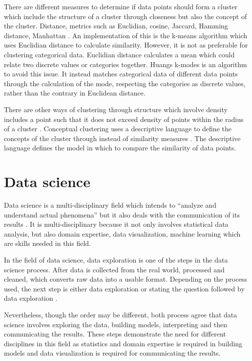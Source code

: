 There are different measures to determine if data points should form a cluster which include the structure of a cluster through closeness but also the concept of the cluster. Distance, metrics such as Euclidian, cosine, Jaccard, Hamming distance, Manhattan \cite{oneilschutt2014}. An implementation of this is the k-means algorithm which uses Euclidian distance to calculate similarity. However, it is not as preferable for clustering categorical data. Euclidian distance calculates a mean which could relate two discrete values or categories together. Huang\textsc{}s k-modes \cite{Huang1998} is an algorithm to avoid this issue. It instead matches categorical data of different data points through the calculation of the mode, respecting the categories as discrete values, rather than the contrary in Euclidean distance. \par

There are other ways of clustering through structure which involve density includes a point such that it does not exceed density of points within the radius of a cluster \cite{tutorialspoint}. Conceptual clustering uses a descriptive language to define the concepts of the cluster through instead of similarity measures \cite{clusteringintroduction}. The descriptive language defines the model in which to compare the similarity of data points.\par

\section{Data science}
Data science is a multi-disciplinary field which intends to ``analyze and understand actual phenomena'' \cite{Hayashi1998} but it also deals with the communication of its results \cite{oneilschutt2014}. It is multi-disciplinary because it not only involves statistical data analysis, but also domain expertise, data visualization, machine learning which are skills needed in this field.\par

In the field of data science, data exploration is one of the steps in the data science process. After data is collected from the real world, processed and cleaned, which converts raw data into a usable format. Depending on the process used, the next step is either data exploration \cite{oneilschutt2014} or stating the question followed by data exploration \cite{peng2016}.\par

Nevertheless, though the order may be different, both process agree that data science involves exploring the data, building models, interpreting and then communicating the results. These steps demonstrate the need for different disciplines in this field as statistics and domain expertise is required in building models and data visualization is required for communicating the results.\par

